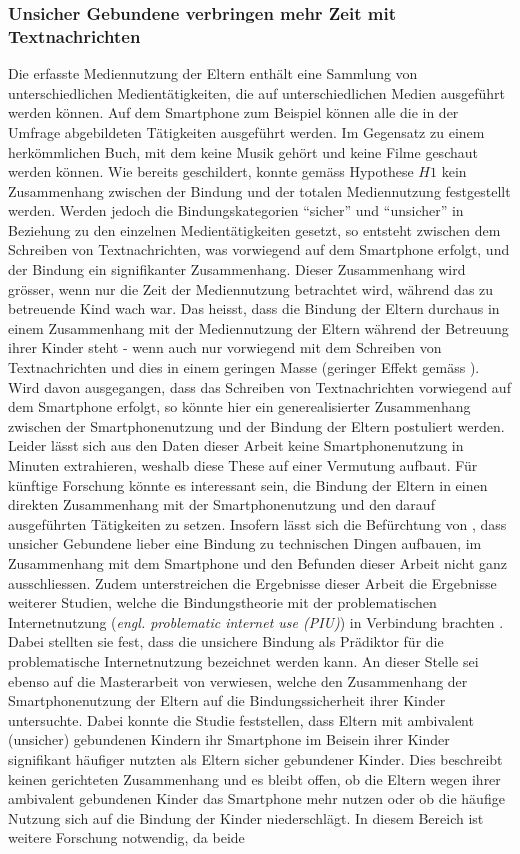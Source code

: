 \subsubsection{Unsicher Gebundene verbringen mehr Zeit mit Textnachrichten}
Die erfasste Mediennutzung der Eltern enthält eine Sammlung von unterschiedlichen Medientätigkeiten, die auf unterschiedlichen Medien ausgeführt werden können. Auf dem Smartphone zum Beispiel können alle die in der Umfrage abgebildeten Tätigkeiten ausgeführt werden. Im Gegensatz zu einem herkömmlichen Buch, mit dem keine Musik gehört und keine Filme geschaut werden können. Wie bereits geschildert, konnte gemäss Hypothese $H1$ kein Zusammenhang zwischen der Bindung und der totalen Mediennutzung festgestellt werden. Werden jedoch die Bindungskategorien \enquote{sicher} und \enquote{unsicher} in Beziehung zu den einzelnen Medientätigkeiten gesetzt, so entsteht zwischen dem Schreiben von Textnachrichten, was vorwiegend auf dem Smartphone erfolgt, und der Bindung ein signifikanter Zusammenhang. Dieser Zusammen\-hang wird grösser, wenn nur die Zeit der Mediennutzung betrachtet wird, während das zu betreuende Kind wach war. Das heisst, dass die Bindung der Eltern durchaus in einem Zusammen\-hang mit der Mediennutzung der Eltern während der Betreuung ihrer Kinder steht - wenn auch nur vorwiegend mit dem Schreiben von Textnachrichten und dies in einem geringen Masse (geringer Effekt gemäss ). Wird davon ausgegangen, dass das Schreiben von Textnachrichten vorwiegend auf dem Smartphone erfolgt, so könnte hier ein generealisierter Zusammenhang zwischen der Smartphonenutzung und der Bindung der Eltern postuliert werden. Leider lässt sich aus den Daten dieser Arbeit keine Smartphonenutzung in Minuten extrahieren, weshalb diese These auf einer Vermutung aufbaut. Für künftige Forschung könnte es interessant sein, die Bindung der Eltern in einen direkten Zusammen\-hang mit der Smartphonenutzung und den darauf ausgeführten Tätigkeiten zu setzen. Insofern lässt sich die Befürchtung von , dass unsicher Gebundene lieber eine Bindung zu technischen Dingen aufbauen, im Zusammenhang mit dem Smartphone und den Befunden dieser Arbeit nicht ganz ausschliessen. Zudem unterstreichen die Ergebnisse dieser Arbeit die Ergebnisse weiterer Studien, welche die Bindungstheorie mit der problematischen Internet\-nutzung (\textit{engl. problematic internet use (PIU)}) in Verbindung brachten \cite{Jia2016, Chang2015, Lin2011}. Dabei stellten sie fest, dass die unsichere Bindung als Prädiktor für die problematische Internetnutzung bezeichnet werden kann. An dieser Stelle sei ebenso auf die Masterarbeit von  verwiesen, welche den Zusammenhang der Smartphonenutzung der Eltern auf die Bindungssicherheit ihrer Kinder untersuchte. Dabei konnte die Studie feststellen, dass Eltern mit ambivalent (unsicher) gebundenen Kindern ihr Smartphone im Beisein ihrer Kinder signifikant häufiger nutzten als Eltern sicher gebundener Kinder. Dies beschreibt keinen gerichteten Zusammenhang und es bleibt offen, ob die Eltern wegen ihrer ambivalent gebundenen Kinder das Smartphone mehr nutzen oder ob die häufige Nutzung sich auf die Bindung der Kinder niederschlägt. In diesem Bereich ist weitere Forschung notwendig, da beide 
